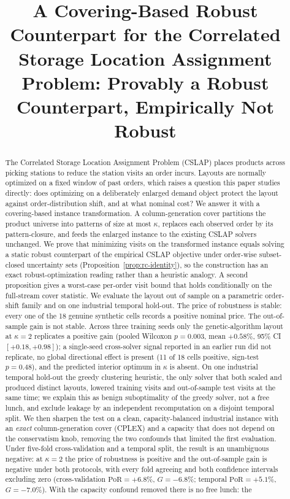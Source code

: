 \documentclass[preprint,review,11pt,authoryear]{elsarticle}
\begin{document}
\begin{frontmatter}

\title{A Covering-Based Robust Counterpart for the Correlated Storage Location Assignment Problem: Provably a Robust Counterpart, Empirically Not Robust}


\begin{abstract}
The Correlated Storage Location Assignment Problem (CSLAP) places products across picking stations to reduce the station visits an order incurs. Layouts are normally optimized on a fixed window of past orders, which raises a question this paper studies directly: does optimizing on a deliberately enlarged demand object protect the layout against order-distribution shift, and at what nominal cost? We answer it with a covering-based instance transformation. A column-generation cover partitions the product universe into patterns of size at most $\kappa$, replaces each observed order by its pattern-closure, and feeds the enlarged instance to the existing CSLAP solvers unchanged. We prove that minimizing visits on the transformed instance equals solving a static robust counterpart of the empirical CSLAP objective under order-wise subset-closed uncertainty sets (Proposition~\ref{prop:rc-identity}), so the construction has an exact robust-optimization reading rather than a heuristic analogy. A second proposition gives a worst-case per-order visit bound that holds conditionally on the full-stream cover statistic. We evaluate the layout out of sample on a parametric order-shift family and on one industrial temporal hold-out. The price of robustness is stable: every one of the 18 genuine synthetic cells records a positive nominal price. The out-of-sample gain is not stable. Across three training seeds only the genetic-algorithm layout at $\kappa=2$ replicates a positive gain (pooled Wilcoxon $p=0.003$, mean $+0.58\%$, 95\% CI $[+0.18,+0.98]$); a single-seed cross-solver signal reported in an earlier run did not replicate, no global directional effect is present (11 of 18 cells positive, sign-test $p=0.48$), and the predicted interior optimum in $\kappa$ is absent. On one industrial temporal hold-out the greedy clustering heuristic, the only solver that both scaled and produced distinct layouts, lowered training visits and out-of-sample test visits at the same time; we explain this as benign suboptimality of the greedy solver, not a free lunch, and exclude leakage by an independent recomputation on a disjoint temporal split. We then sharpen the test on a clean, capacity-balanced industrial instance with an \emph{exact} column-generation cover (CPLEX) and a capacity that does not depend on the conservatism knob, removing the two confounds that limited the first evaluation. Under five-fold cross-validation and a temporal split, the result is an unambiguous negative: at $\kappa=2$ the price of robustness is positive and the out-of-sample gain is negative under both protocols, with every fold agreeing and both confidence intervals excluding zero (cross-validation $\mathrm{PoR}=+6.8\%$, $G=-6.8\%$; temporal $\mathrm{PoR}=+5.1\%$, $G=-7.0\%$). With the capacity confound removed there is no free lunch: the 
\end{abstract}
\end{frontmatter}
\end{document}
